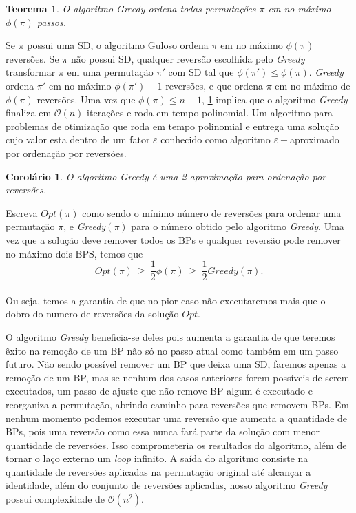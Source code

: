 \newtheorem{Theorem}{Teorema}
\begin{Theorem}
\label{teorema}
O algoritmo Greedy ordena todas permutações $\pi$ em no máximo $\phi(\pi)$ passos.
\end{Theorem}
\begin{prova}
Se $\pi$ possui uma SD, o algoritmo Guloso ordena $\pi$ em no máximo $\phi(\pi)$ reversões. Se $\pi$ não possui SD, qualquer reversão escolhida pelo \textit{Greedy} transformar $\pi$ em uma permutação $\pi'$ com SD tal que $\phi(\pi') \leq \phi(\pi)$. \textit{Greedy} ordena $\pi'$ em no máximo $\phi(\pi') - 1$ reversões, e que ordena $\pi$ em no máximo de $\phi(\pi)$ reversões.
Uma vez que $\phi(\pi) \leq n + 1$, \ref{teorema} implica que o algoritmo \textit{Greedy} finaliza em $\mathcal{O}(n)$ iterações e roda em tempo polinomial. Um algoritmo para problemas de otimização que roda em tempo polinomial e entrega uma solução cujo valor esta dentro de um fator $\varepsilon$ conhecido como algoritmo $\varepsilon-$aproximado por ordenação por reversões.
\end{prova}

\newtheorem{Corollary}{Corolário}
\begin{Corollary}
O algoritmo Greedy é uma 2-aproximação para ordenação por reversões.
\end{Corollary}
\begin{prova}
Escreva $Opt(\pi)$ como sendo o mínimo número de reversões para ordenar uma permutação $\pi$, e \textit{Greedy}$(\pi)$ para o número obtido pelo algoritmo \textit{Greedy}. Uma vez que a solução deve remover todos os BPs e qualquer reversão pode remover no máximo dois BPS, temos que
\[ Opt(\pi) \ \ge \ \frac{1}{2}\phi(\pi) \ \ge \ \frac{1}{2}\textit{Greedy}(\pi).\] \\

Ou seja, temos a garantia de que no pior caso não executaremos mais que o dobro do numero de reversões da solução $Opt$.
\end{prova}


O algoritmo \textit{Greedy} beneficia-se deles pois aumenta a garantia de que teremos êxito na remoção de um BP não só no passo atual como também em um passo futuro. Não sendo possível remover um BP que deixa uma SD, faremos apenas a remoção de um BP, mas se nenhum dos casos anteriores forem possíveis de serem executados, um passo de ajuste que não remove BP algum é executado e reorganiza a permutação, abrindo caminho para reversões que removem BPs. Em nenhum momento podemos executar uma reversão que aumenta a quantidade de BPs, pois uma reversão como essa nunca fará parte da solução com menor quantidade de reversões. Isso comprometeria os resultados do algoritmo, além de tornar o laço externo um \textit{loop} infinito. A saída do algoritmo consiste na quantidade de reversões aplicadas na permutação original até alcançar a identidade, além do conjunto de reversões aplicadas, nosso algoritmo \textit{Greedy} possui complexidade de $\mathcal{O}(n^2)$.

